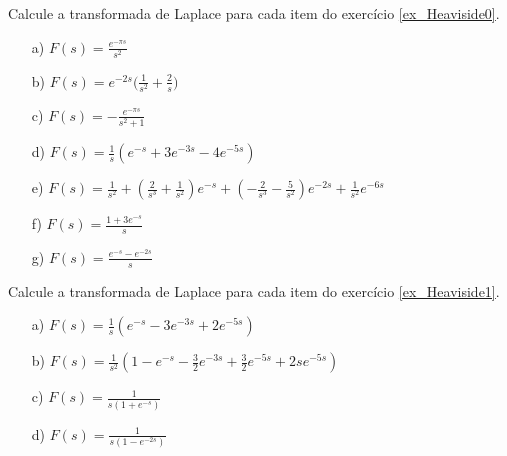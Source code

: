 \begin{exer} Calcule a transformada de Laplace para cada item do exercício \ref{ex_Heaviside0}.
\end{exer}
\begin{resp}
 \begin{itemize}
 \item [a)] $F(s)=\displaystyle \frac{e^{-\pi s}}{s^2}$
 \item [b)] $F(s)=\displaystyle e^{-2s}\bigg(\frac{1}{s^2}  + \frac{2}{s}\bigg)$
 \item [c)] $F(s)=\displaystyle - \frac{e^{-\pi s}}{s^2 +1}$
 \item [d)] $F(s)=\frac{1}{s}\left(e^{-s}+3e^{-3s}-4e^{-5s}\right)$
 \item [e)] $F(s)=\frac{1}{s^2}+\left(\frac{2}{s^3}+\frac{1}{s^2}\right)e^{-s}+\left(-\frac{2}{s^3}-\frac{5}{s^2}\right)e^{-2s}+\frac{1}{s^2}e^{-6s}$
 \item [f)]$F(s) = \frac{1+3e^{-s}}{s}$
 \item [g)] $F(s) = \frac{e^{-s}-e^{-2s}}{s}$
 \end{itemize}
\end{resp}
\begin{exer} Calcule a transformada de Laplace para cada item do exercício \ref{ex_Heaviside1}.
\end{exer}
\begin{resp}
 \begin{itemize}
  \item[a)] $F(s)=\frac{1}{s}\left(e^{-s}-3e^{-3s}+2e^{-5s}\right)$
    \item[b)] $F(s)=\frac{1}{s^2}\left(1-e^{-s}-\frac{3}{2}e^{-3s}+\frac{3}{2}e^{-5s}+2se^{-5s}\right)$
        \item[c)] $F(s)=\frac{1}{s(1+e^{-s})}$
        \item[d)] $F(s)=\frac{1}{s(1-e^{-2s})}$
 \end{itemize}
\end{resp}
